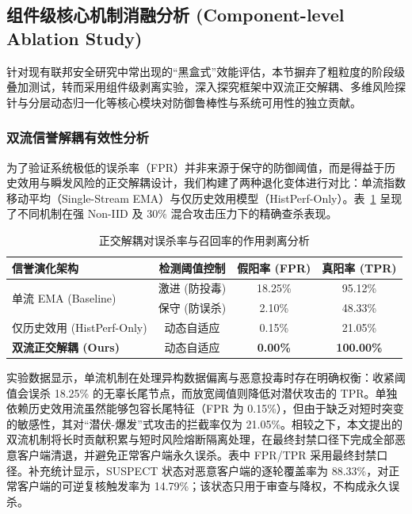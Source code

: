 \documentclass[11pt, a4paper, UTF8, fontset=fandol]{ctexart}
\begin{document}
\subsection{组件级核心机制消融分析 (Component-level Ablation Study)}
针对现有联邦安全研究中常出现的“黑盒式”效能评估，本节摒弃了粗粒度的阶段级叠加测试，转而采用组件级剥离实验，深入探究框架中双流正交解耦、多维风险探针与分层动态归一化等核心模块对防御鲁棒性与系统可用性的独立贡献。

\subsubsection{双流信誉解耦有效性分析}
为了验证系统极低的误杀率（FPR）并非来源于保守的防御阈值，而是得益于历史效用与瞬发风险的正交解耦设计，我们构建了两种退化变体进行对比：单流指数移动平均（Single-Stream EMA）与仅历史效用模型（HistPerf-Only）。表~\ref{tab:ablation_stream} 呈现了不同机制在强 Non-IID 及 30\% 混合攻击压力下的精确查杀表现。

\begin{table}[htbp]
    \centering
    \caption{正交解耦对误杀率与召回率的作用剥离分析}
    \label{tab:ablation_stream}
    \begin{tabular}{l c c c}
        \toprule
        \textbf{信誉演化架构}                & \textbf{检测阈值控制} & \textbf{假阳率 (FPR)} & \textbf{真阳率 (TPR)} \\
        \midrule
        \multirow{2}{*}{单流 EMA (Baseline)} & 激进 (防投毒)         & 18.25\%               & 95.12\%               \\
                                             & 保守 (防误杀)         & 2.10\%                & 48.33\%               \\
        \midrule
        仅历史效用 (HistPerf-Only)           & 动态自适应            & 0.15\%                & 21.05\%               \\
        \textbf{双流正交解耦 (Ours)}         & 动态自适应            & \textbf{0.00\%}       & \textbf{100.00\%}     \\
        \bottomrule
    \end{tabular}
\end{table}

实验数据显示，单流机制在处理异构数据偏离与恶意投毒时存在明确权衡：收紧阈值会误杀 18.25\% 的无辜长尾节点，而放宽阈值则降低对潜伏攻击的 TPR。单独依赖历史效用流虽然能够包容长尾特征（FPR 为 0.15\%），但由于缺乏对短时突变的敏感性，其对“潜伏-爆发”式攻击的拦截率仅为 21.05\%。相较之下，本文提出的双流机制将长时贡献积累与短时风险熔断隔离处理，在最终封禁口径下完成全部恶意客户端清退，并避免正常客户端永久误杀。表中 FPR/TPR 采用最终封禁口径。补充统计显示，SUSPECT 状态对恶意客户端的逐轮覆盖率为 88.33\%，对正常客户端的可逆复核触发率为 14.79\%；该状态只用于审查与降权，不构成永久误杀。
\end{document}

